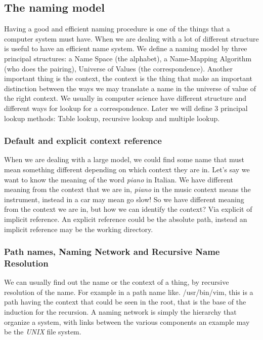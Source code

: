 \documentclass{article}
\begin{document}
    \subsection{The naming model}
      Having a good and efficient naming procedure is one of the things that a computer
      system must have. When we are dealing with a lot of different structure is useful 
      to have an efficient name system. We define a naming model by three principal 
      structures: a Name Space (the alphabet), a Name-Mapping Algorithm (who does the pairing), 
      Universe of Values (the correspondence). Another important thing is the context, the
      context is the thing that make an important distinction between the ways we may 
      translate a name in the universe of value of the right context. We usually in computer
      science have different structure and different ways for lookup for a correspondence. Later
      we will define 3 principal lookup methods: Table lookup, recursive lookup and multiple 
      lookup.
      \subsubsection{Default and explicit context reference}
        When we are dealing with a large model, we could find some name that must 
        mean something different depending on which context they are in. Let's say 
        we want to know the meaning of the word \textit{piano} in Italian. We have different
        meaning from the context that we are in, \textit{piano} in the music context
        means the instrument, instead in a car may mean go slow! So we have different
        meaning from the context we are in, but how we can identify the context?
        Via explicit of implicit reference. An explicit reference could be the 
        absolute path, instead an implicit reference may be the working directory.
      \subsubsection{Path names, Naming Network and Recursive Name Resolution}
        We can usually find out the name or the context of a thing, by recursive resolution
        of the name. For example in a path name like. /usr/bin/vim, this is a path having
        the context that could be seen in the root, that is the base of the induction
        for the recursion. A naming network is simply the hierarchy that organize a 
        system, with links between the various components an example may be the 
        \textit{UNIX} file system.
\end{document}
